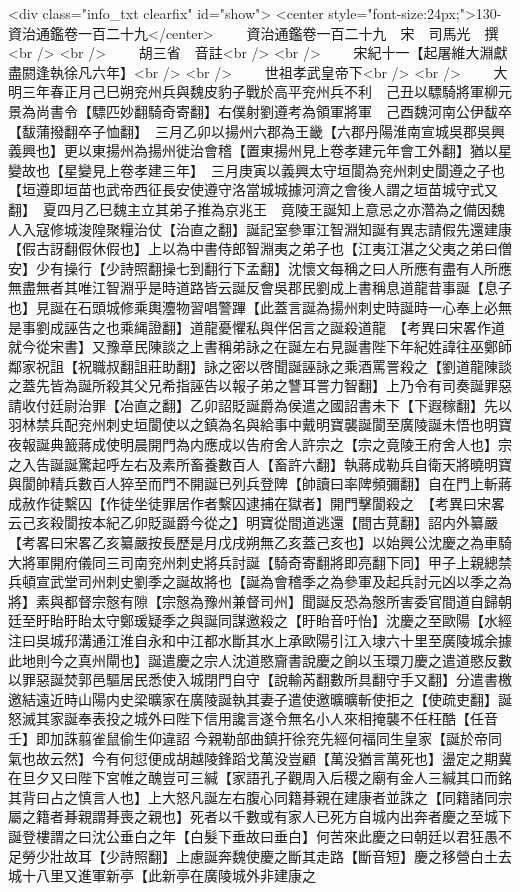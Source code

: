 <div class="info_txt clearfix" id="show">
<center style="font-size:24px;">130-資治通鑑卷一百二十九</center>
  　　資治通鑑卷一百二十九　宋　司馬光　撰<br />
<br />
　　胡三省　音註<br />
<br />
　　宋紀十一【起屠維大淵獻盡閼逢執徐凡六年】<br />
<br />
　　世祖孝武皇帝下<br />
<br />
　　大明三年春正月己巳朔兖州兵與魏皮豹子戰於高平兖州兵不利　己丑以驃騎將軍柳元景為尚書令【驃匹妙翻騎奇寄翻】右僕射劉遵考為領軍將軍　己酉魏河南公伊馛卒【馛蒲撥翻卒子恤翻】　三月乙卯以揚州六郡為王畿【六郡丹陽淮南宣城吳郡吳興義興也】更以東揚州為揚州徙治會稽【置東揚州見上卷孝建元年會工外翻】猶以星變故也【星變見上卷孝建三年】　三月庚寅以義興太守垣閬為兖州刺史閬遵之子也【垣遵即垣苗也武帝西征長安使遵守洛當城城據河濟之會後人謂之垣苗城守式又翻】　夏四月乙巳魏主立其弟子推為京兆王　竟陵王誕知上意忌之亦濳為之備因魏人入寇修城浚隍聚糧治仗【治直之翻】誕記室參軍江智淵知誕有異志請假先還建康【假古訝翻假休假也】上以為中書侍郎智淵夷之弟子也【江夷江湛之父夷之弟曰僧安】少有操行【少詩照翻操七到翻行下孟翻】沈懷文每稱之曰人所應有盡有人所應無盡無者其唯江智淵乎是時道路皆云誕反會吳郡民劉成上書稱息道龍昔事誕【息子也】見誕在石頭城修乘輿灋物習唱警蹕【此蓋言誕為揚州刺史時誕時一心奉上必無是事劉成誣告之也乘䋲證翻】道龍憂懼私與伴侶言之誕殺道龍　【考異曰宋畧作道就今從宋書】又豫章民陳談之上書稱弟詠之在誕左右見誕書陛下年紀姓諱往巫鄭師鄰家祝詛【祝職叔翻詛莊助翻】詠之密以啓聞誕誣詠之乘酒罵詈殺之【劉道龍陳談之蓋先皆為誕所殺其父兄希指誣告以報子弟之讐耳詈力智翻】上乃令有司奏誕罪惡請收付廷尉治罪【冶直之翻】乙卯詔貶誕爵為侯遣之國詔書未下【下遐稼翻】先以羽林禁兵配兖州刺史垣閬使以之鎮為名與給事中戴明寶襲誕閬至廣陵誕未悟也明寶夜報誕典籖蔣成使明晨開門為内應成以告府舍人許宗之【宗之竟陵王府舍人也】宗之入告誕誕驚起呼左右及素所畜養數百人【畜許六翻】執蔣成勒兵自衛天將曉明寶與閬帥精兵數百人猝至而門不開誕已列兵登陴【帥讀曰率陴頻彌翻】自在門上斬蔣成赦作徒繫囚【作徒坐徒罪居作者繫囚逮捕在獄者】開門擊閬殺之　【考異曰宋畧云己亥殺閬按本紀乙卯貶誕爵今從之】明寶從間道逃還【間古莧翻】詔内外纂嚴　【考畧曰宋畧乙亥纂嚴按長歷是月戊戌朔無乙亥蓋己亥也】以始興公沈慶之為車騎大將軍開府儀同三司南兖州刺史將兵討誕【騎奇寄翻將即亮翻下同】甲子上親總禁兵頓宣武堂司州刺史劉季之誕故將也【誕為會稽季之為參軍及起兵討元凶以季之為將】素與都督宗慤有隙【宗慤為豫州兼督司州】聞誕反恐為慤所害委官間道自歸朝廷至盱眙盱眙太守鄭瑗疑季之與誕同謀邀殺之【盱眙音吁怡】沈慶之至歐陽【水經注曰吳城䢴溝通江淮自永和中江都水斷其水上承歐陽引江入埭六十里至廣陵城余據此地則今之真州閘也】誕遣慶之宗人沈道愍齎書說慶之餉以玉環刀慶之遣道愍反數以罪惡誕焚郭邑驅居民悉使入城閉門自守【說輸芮翻數所具翻守手又翻】分遣書檄邀結遠近時山陽内史梁曠家在廣陵誕執其妻子遣使邀曠曠斬使拒之【使疏吏翻】誕怒滅其家誕奉表投之城外曰陛下信用讒言遂令無名小人來相掩襲不任枉酷【任音壬】即加誅翦雀鼠偷生仰違詔今親勒部曲鎮扞徐兖先經何福同生皇家【誕於帝同氣也故云然】今有何愆便成胡越陵鋒蹈戈萬没豈顧【萬没猶言萬死也】盪定之期冀在旦夕又曰陛下宮帷之醜豈可三緘【家語孔子觀周入后稷之廟有金人三緘其口而銘其背曰占之慎言人也】上大怒凡誕左右腹心同籍朞親在建康者並誅之【同籍諸同宗屬之籍者朞親謂朞喪之親也】死者以千數或有家人已死方自城内出奔者慶之至城下誕登樓謂之曰沈公垂白之年【白髮下垂故曰垂白】何苦來此慶之曰朝廷以君狂愚不足勞少壯故耳【少詩照翻】上慮誕奔魏使慶之斷其走路【斷音短】慶之移營白土去城十八里又進軍新亭【此新亭在廣陵城外非建康之